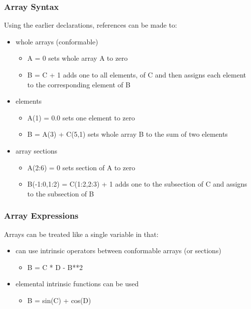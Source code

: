 \documentclass[11pt]{beamer}
\begin{document}
\begin{frame}[fragile]
\frametitle{Array Syntax}

Using the earlier declarations, references can be made to:

\begin{itemize}
\item whole arrays (conformable)
\begin{itemize}
\item A = 0 sets whole array A to zero
\item B = C + 1 adds one to all elements, of C and then assigns each element to the corresponding element of B
 \end{itemize}

\item elements
\begin{itemize}
\item A(1) = 0.0 sets one element to zero
\item B = A(3) + C(5,1) sets whole array B to the sum of two elements
 \end{itemize}

\item array sections
\begin{itemize}
\item A(2:6) = 0 sets section of A to zero
\item B(-1:0,1:2) = C(1:2,2:3) + 1 adds one to the subsection of C and assigns to the subsection of B
 \end{itemize}
 \end{itemize}
\bigskip
 
\end{frame}


\begin{frame}[fragile]
\frametitle{Array Expressions}

Arrays can be treated like a single variable in that:
\begin{itemize}
\item can use intrinsic operators between conformable arrays (or sections)
\begin{itemize}
\item B = C * D - B**2
 \end{itemize}

\item elemental intrinsic functions can be used
\begin{itemize}
\item B = sin(C) + cos(D)
 \end{itemize}

 \end{itemize}
\bigskip
 
\end{frame}
\end{document}
